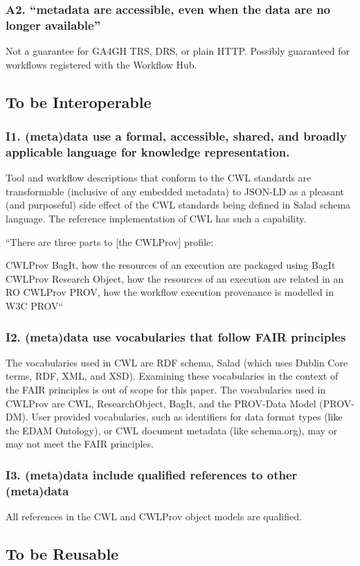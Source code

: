\subsubsection{A2. “metadata are accessible, even when the data are no longer available”}
Not a guarantee for GA4GH TRS, DRS, or plain HTTP. Possibly guaranteed for workflows registered with the Workflow Hub.
\subsection{To be Interoperable}
\subsubsection{I1. (meta)data use a formal, accessible, shared, and broadly applicable language for knowledge representation.}
Tool and workflow descriptions that conform to the CWL standards are transformable (inclusive of any embedded metadata) to JSON-LD as a pleasant (and purposeful) side effect of the CWL standards being defined in Salad schema language. The reference implementation of CWL has such a capability.

“There are three parts to [the CWLProv] profile:

	CWLProv BagIt, how the resources of an execution are packaged using BagIt
	CWLProv Research Object, how the resources of an execution are related in an RO
	CWLProv PROV, how the workflow execution provenance is modelled in W3C PROV“
\subsubsection{I2. (meta)data use vocabularies that follow FAIR principles}
The vocabularies used in CWL are RDF schema, Salad (which uses Dublin Core terms, RDF, XML, and XSD). Examining these vocabularies in the context of the FAIR principles is out of scope for this paper. The vocabularies used in CWLProv are CWL, ResearchObject, BagIt, and the PROV-Data Model (PROV-DM). User provided vocabularies, such as identifiers for data format types (like the EDAM Ontology), or CWL document metadata (like schema.org), may or may not meet the FAIR principles.
\subsubsection{I3. (meta)data include qualified references to other (meta)data}
All references in the CWL and CWLProv object models are qualified.
\subsection{To be Reusable}
